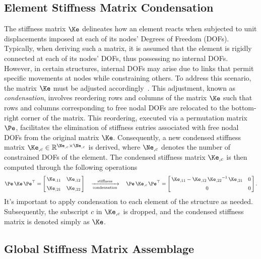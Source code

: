 \subsection{Element Stiffness Matrix Condensation}

The stiffness matrix $\Ke$ delineates how an element reacts when subjected to unit displacements imposed at each of its nodes' Degrees of Freedom (\acp{DOF}). Typically, when deriving such a matrix, it is assumed that the element is rigidly connected at each of its nodes' \acp{DOF}, thus possessing no internal \acp{DOF}. However, in certain structures, internal \acp{DOF} may arise due to links that permit specific movements at nodes while constraining others. To address this scenario, the matrix $\Ke$ must be adjusted accordingly~\cite{logan2002first}. This adjustment, known as \emph{condensation}, involves reordering rows and columns of the matrix $\Ke$ such that rows and columns corresponding to free nodal \acp{DOF} are relocated to the bottom-right corner of the matrix. This reordering, executed via a permutation matrix $\Pe$, facilitates the elimination of stiffness entries associated with free nodal \acp{DOF} from the original matrix $\Ke$. Consequently, a new condensed stiffness matrix ${\Ke}_{,c} \in \mathbb{R}^{{\Ne}_{,c} \times {\Ne}_{,c}}$ is derived, where ${\Ne}_{,c}$ denotes the number of constrained \acp{DOF} of the element. The condensed stiffness matrix ${\Ke}_{,c}$ is then computed through the following operations
%
\begin{equation}
  \Pe \, \Ke \, \Pe^\top= \left[\,\begin{matrix}
    {\Ke}_{,11} & {\Ke}_{,12} \\[0.5em]
    {\Ke}_{,21} & {\Ke}_{,22}
  \end{matrix}\,\right] \quad \xrightarrow[\text{condensation}]{\text{stiffness}} \quad
   \Pe \, {\Ke}_{,c} \, \Pe^\top = \left[\,\begin{matrix}
    {\Ke}_{,11} - {\Ke}_{,12} \, {{\Ke}_{,22}}^{-1} \, {\Ke}_{,21} & 0 \\[0.5em]
    0 & 0
  \end{matrix}\,\right] \text{.}
\end{equation}
%
It's important to apply condensation to each element of the structure as needed. Subsequently, the subscript $c$ in ${\Ke}_{,c}$ is dropped, and the condensed stiffness matrix is denoted simply as $\Ke$.

\subsection{Global Stiffness Matrix Assemblage}

